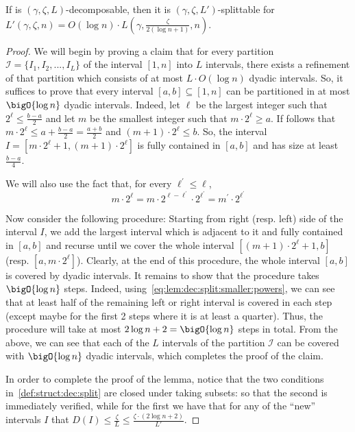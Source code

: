 \begin{lemma}\label{lemma:decomposable:splittable}
If \class is $(\gamma,\zeta,L)$-decomposable, then it is $(\gamma, \zeta, L')$-splittable for $L'(\gamma,\zeta,n) = O(\log n)\cdot L(\gamma,\frac{\zeta}{2(\log n+1)},n)$.
\end{lemma}
\begin{proof}
We will begin by proving a claim that for every partition $\mathcal{I}=\{I_1,I_2,...,I_L\}$ of the interval $[1,n]$ into $L$ intervals, there exists a refinement of that partition which consists of at most $L\cdot O(\log n)$ dyadic intervals. So, it suffices to prove that every interval $[a,b]\subseteq [1,n]$ can be partitioned in at most $\bigO{\log n}$ dyadic intervals. Indeed, let $\ell$ be the largest integer such that $2^\ell\leq \frac{b-a}{2}$ and let $m$ be the smallest integer such that $m\cdot 2^\ell\geq a$. If follows that $m\cdot 2^\ell\leq a+\frac{b-a}{2}=\frac{a+b}{2}$ and $(m+1)\cdot 2^\ell\leq b$. So, the interval $I=[m\cdot 2^\ell+1,(m+1)\cdot 2^\ell]$ is fully contained in $[a,b]$ and has size at least $\frac{b-a}{4}$. 

We will also use the fact that, for every $\ell^\prime\leq \ell$,
\begin{equation}\label{eq:lem:dec:split:smaller:powers}
m\cdot 2^\ell=m\cdot 2^{\ell-\ell^\prime}\cdot 2^{\ell^\prime}=m^\prime \cdot 2^{\ell^\prime}
\end{equation} 

Now consider the following procedure: Starting from right (resp. left) side of the interval $I$, we add the largest interval which is adjacent to it and fully contained in $[a,b]$ and recurse until we cover the whole interval $[(m+1)\cdot 2^\ell+1,b]$ (resp. $[a,m\cdot 2^\ell]$). Clearly, at the end of this procedure, the whole interval $[a,b]$ is covered by dyadic intervals. It remains to show that the procedure takes $\bigO{\log n}$ steps. Indeed, using~\cref{eq:lem:dec:split:smaller:powers}, we can see that at least half of the remaining left or right interval is covered in each step (except maybe for the first 2 steps where it is at least a quarter). Thus, the procedure will take at most $2\log n +2=\bigO{\log n}$ steps in total. From the above, we can see that each of the $L$ intervals of the partition $\mathcal{I}$ can be covered with $\bigO{\log n}$ dyadic intervals, which completes the proof of the claim. 

In order to complete the proof of the lemma, notice that the two conditions in~\cref{def:struct:dec:split} are closed under taking subsets: so that the second is immediately verified, while for the first we have that for any of the ``new'' intervals $I$ that $D(I) \leq  \frac{\zeta}{L} \leq \frac{\zeta\cdot (2\log n+2)}{L'}$. 
\end{proof}

